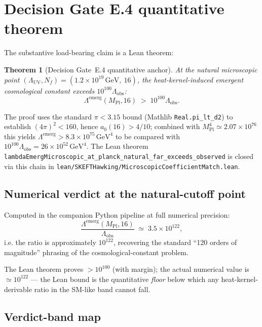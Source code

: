 \documentclass[twocolumn]{revtex4-2}
\newtheorem{theorem}{Theorem}
\newcommand{\Nf}{N_f}
\newcommand{\LambdaUV}{\Lambda_{\mathrm{UV}}}
\newcommand{\Lambdaemerg}{\Lambda^{\mathrm{emerg}}}
\newcommand{\Lambdaobs}{\Lambda_{\mathrm{obs}}}
\newcommand{\MPl}{M_{\mathrm{Pl}}}
\begin{document}
\section{Decision Gate E.4 quantitative theorem}

The substantive load-bearing claim is a Lean theorem:

\begin{theorem}[Decision Gate~E.4 quantitative anchor]
\label{thm:DG-E4}
At the natural microscopic point
$(\LambdaUV,\Nf) = (1.2\times 10^{19}\,\mathrm{GeV},\ 16)$, the
heat-kernel-induced emergent cosmological constant exceeds
$10^{100}\Lambdaobs$:
\begin{equation}
  \Lambdaemerg(\MPl,16) \;>\; 10^{100}\Lambdaobs.
\end{equation}
\end{theorem}

The proof uses the standard $\pi < 3.15$ bound (Mathlib
\texttt{Real.pi\_lt\_d2}) to establish $(4\pi)^{2} < 160$, hence
$a_{0}(16) > 4/10$; combined with $\MPl^{4} \simeq 2.07\times 10^{76}$
this yields $\Lambdaemerg > 8.3\times 10^{75}\,\mathrm{GeV}^{4}$ to
be compared with $10^{100}\Lambdaobs = 26\times 10^{52}\,\mathrm{GeV}^{4}$.
The Lean theorem \texttt{lambdaEmerg\-Microscopic\_at\_planck\_natural\_far\_exceeds\_observed}
is closed via this chain in
\texttt{lean/SKEFTHawking/MicroscopicCoefficientMatch.lean}.

\subsection{Numerical verdict at the natural-cutoff point}

Computed in the companion Python pipeline at full numerical
precision:
\begin{equation}
  \frac{\Lambdaemerg(\MPl,16)}{\Lambdaobs}
    \;\simeq\; 3.5\times 10^{122},
\end{equation}
i.e. the ratio is approximately $10^{122}$, recovering the standard
``120 orders of magnitude'' phrasing of the cosmological-constant
problem.

The Lean theorem proves $> 10^{100}$ (with margin); the actual
numerical value is $\simeq 10^{122}$ --- the Lean bound is the
quantitative \emph{floor} below which any heat-kernel-derivable ratio
in the SM-like band cannot fall.

\subsection{Verdict-band map}
\end{document}
